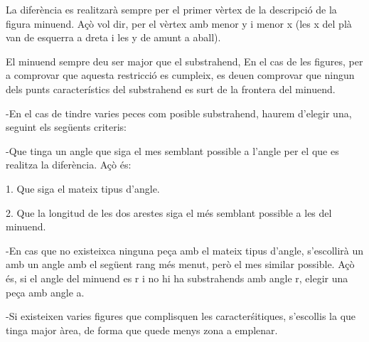 \documentclass{article}
\begin{document}
La diferència es realitzarà sempre per el primer vèrtex de la descripció de la figura minuend. Açò vol dir, per el vèrtex amb menor y i menor x (les x del plà van de esquerra a dreta i les y de amunt a aball).

El minuend sempre deu ser major que el substrahend, En el cas de les figures, per a comprovar que aquesta restricció es cumpleix, es deuen comprovar que ningun dels punts característics del substrahend es surt de la frontera del minuend.

-En el cas de tindre varies peces com posible substrahend, haurem d’elegir una, seguint els següents criteris:

    -Que tinga un angle que siga el mes semblant possible a l’angle per el que es realitza la diferència. Açò és:

        1. Que siga el mateix tipus d’angle.

        2. Que la longitud de les dos arestes siga el més semblant possible a les del minuend.

-En cas que no existeixca ninguna peça amb el mateix tipus d’angle, s’escollirà un amb un angle amb el següent rang més menut, però el mes similar possible. Açò és, si el angle del minuend es r i no hi ha substrahends amb angle r, elegir una peça amb angle a.

-Si existeixen varies figures que complisquen les caracterśitiques, s’escollis la que tinga major àrea, de forma que quede menys zona a emplenar.




\end{document}
